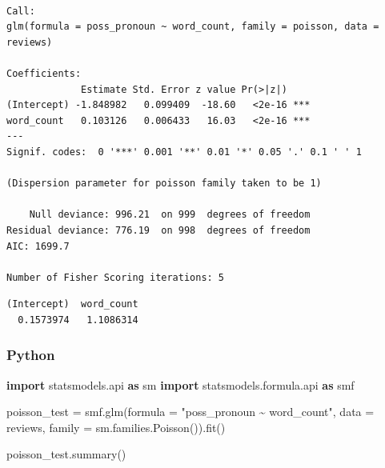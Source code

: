 \documentclass[
  letterpaper,
]{krantz}
\newenvironment{Shaded}{}{}
\newcommand{\FunctionTok}[1]{\textcolor[rgb]{0.02,0.16,0.49}{#1}}
\newcommand{\ImportTok}[1]{\textcolor[rgb]{0.00,0.50,0.00}{\textbf{#1}}}
\newcommand{\NormalTok}[1]{#1}
\newcommand{\OperatorTok}[1]{\textcolor[rgb]{0.40,0.40,0.40}{#1}}
\newcommand{\SpecialCharTok}[1]{\textcolor[rgb]{0.25,0.44,0.63}{#1}}
\newcommand{\StringTok}[1]{\textcolor[rgb]{0.25,0.44,0.63}{#1}}
\begin{document}
\begin{verbatim}

Call:
glm(formula = poss_pronoun ~ word_count, family = poisson, data = reviews)

Coefficients:
             Estimate Std. Error z value Pr(>|z|)    
(Intercept) -1.848982   0.099409  -18.60   <2e-16 ***
word_count   0.103126   0.006433   16.03   <2e-16 ***
---
Signif. codes:  0 '***' 0.001 '**' 0.01 '*' 0.05 '.' 0.1 ' ' 1

(Dispersion parameter for poisson family taken to be 1)

    Null deviance: 996.21  on 999  degrees of freedom
Residual deviance: 776.19  on 998  degrees of freedom
AIC: 1699.7

Number of Fisher Scoring iterations: 5
\end{verbatim}

\begin{Shaded}
\end{Shaded}

\begin{verbatim}
(Intercept)  word_count 
  0.1573974   1.1086314 
\end{verbatim}

\subsubsection{Python}

\begin{Shaded}
\begin{Highlighting}[]
\ImportTok{import}\NormalTok{ statsmodels.api }\ImportTok{as}\NormalTok{ sm}
\ImportTok{import}\NormalTok{ statsmodels.formula.api }\ImportTok{as}\NormalTok{ smf}

\NormalTok{poisson\_test }\OperatorTok{=}\NormalTok{ smf.glm(formula }\OperatorTok{=} \StringTok{"poss\_pronoun \textasciitilde{} word\_count"}\NormalTok{,}
\NormalTok{                       data }\OperatorTok{=}\NormalTok{ reviews,}
\NormalTok{                       family }\OperatorTok{=}\NormalTok{ sm.families.Poisson()).fit()}

\NormalTok{poisson\_test.summary()        }
\end{Highlighting}
\end{Shaded}
\end{document}

